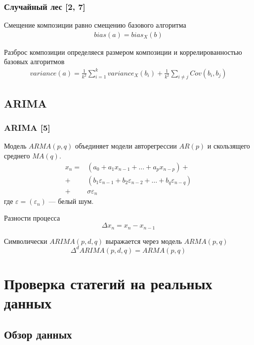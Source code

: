 \documentclass{beamer}
\newcommand{\COV}[2]{Cov\left(#1, #2\right)}
\renewcommand{\epsilon}{\varepsilon}
\begin{document}
\begin{frame}
    \frametitle{Случайный лес [2, 7]}

    Смещение композиции равно смещению базового алгоритма
    \begin{align*}
        bias(a) = bias_X(b)
    \end{align*}
    
    Разброс композиции определяеся размером композиции и коррелированностью базовых алгоритмов
    \begin{align*}
    	variance(a) =
         \frac{1}{k^2} \sum_{i=1}^{k} variance_X(b_i) + 
        \frac{1}{k^2} \sum_{i \ne j} \COV{b_i}{b_j}
    \end{align*}

\end{frame}

\subsection{ARIMA}

\begin{frame}
    \frametitle{ARIMA [5]}
    Модель $ARMA(p, q)$ объединяет модели авторегрессии $AR(p)$ и скользящего среднего $MA(q)$.
    \begin{align*}
        x_n = & \left(a_0 + a_1 x_{n-1} + \dots + a_p x_{n-p} \right) + \\
	    + & \left(b_1 \epsilon_{n-1} + b_2 \epsilon_{n-2} + \dots + b_q \epsilon_{n - q} \right) \\
        + & \sigma \epsilon_n
    \end{align*}
    где $\epsilon = (\epsilon_n)$ --- белый шум.

    Разности процесса
    \[
        \Delta x_n = x_n - x_{n-1}
    \]

    Символически $ARIMA(p, d, q)$ выражается через модель $ARMA(p, q)$
    \[
        \Delta^d ARIMA(p, d, q) = ARMA(p, q)
    \]
\end{frame}

\section{Проверка статегий на реальных данных}

\subsection{Обзор данных}
\end{document}

